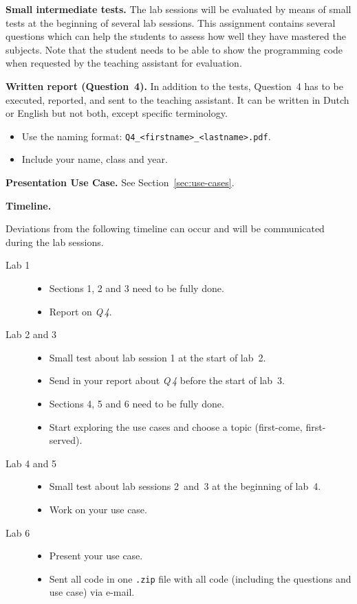\documentclass[11pt,a4paper]{article}
\begin{document}
\textbf{Small intermediate tests.}
The lab sessions will be evaluated by means of small tests at the beginning of several lab sessions. This assignment contains several questions which can help the students to assess how well they have mastered the subjects. Note that the student needs to be able to show the programming code when requested by the teaching assistant for evaluation.

\textbf{Written report (Question~4).}
In addition to the tests, Question~4 has to be executed, reported, and sent to the teaching assistant. It can be written in Dutch or English but not both, except specific terminology. 
\begin{itemize}
    \item Use the naming format:  \verb|Q4_<firstname>_<lastname>.pdf|.
    \item Include your name, class and year.
\end{itemize} 

\textbf{Presentation Use Case.}
See Section~\ref{sec:use-cases}.


\textbf{Timeline.}

Deviations from the following timeline can occur and will be communicated during the lab sessions. 

\begin{description}
    \item[Lab 1]\hfill
    \begin{itemize}
        \item Sections 1, 2 and 3 need to be fully done.
        \item Report on \textit{Q\,4}.
    \end{itemize}
    \item[Lab 2 and 3]\hfill
    \begin{itemize}
        \item Small test about lab session 1 at the start of lab~2.
        \item Send in your report about \textit{Q\,4} before the start of lab~3.
        \item Sections 4, 5 and 6 need to be fully done.
        \item Start exploring the use cases and choose a topic (first-come, first-served).
    \end{itemize}
    \item[Lab 4 and 5]\hfill
     \begin{itemize}
        \item Small test about lab sessions 2~and~3 at the beginning of lab~4.
        \item  Work on your use case.
     \end{itemize}
    \item[Lab 6]\hfill
    \begin{itemize}
        \item Present your use case.
        \item Sent all code in one \texttt{.zip} file with all code (including the questions and use case) via e-mail.
     \end{itemize}
        
\end{description}
\end{document}
